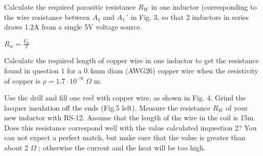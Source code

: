 \documentclass{../../myassignment}
\newcommand{\ohm}{$\Omega$ }
\begin{document}
	\begin{problem}
		Calculate the required parasitic resistance $R_W$ in one inductor (corresponding to the wire resistance between $A_1$ and $A_1\,’$ in Fig. 3, so that 2 inductors in series draws 1.2A from a single 5V voltage source.
		
	\end{problem}

	\begin{answer}
		$R_w = \frac{V_w}{I}$
	\end{answer}

	\begin{problem}
		Calculate the required length of copper wire in one inductor to get the resistance found in question 1 for a 0.4mm diam (AWG26) copper wire when the resistivity of copper is $\rho = 1.7\cdot10^{-8}$ \ohm m.
	\end{problem}

	\begin{answer}
	
	\end{answer}

	\begin{problem}
		Use the drill and fill one reel with copper wire, as shown in Fig. 4.  Grind the lacquer insulation off the ends (Fig.5 left).  Measure the resistance $R_W$ of your new inductor with RS-12.  Assume that the length of the wire in the coil is 15m.  Does this resistance correspond well with the value calculated inquestion 2?  You can not expect a perfect match, but make sure that the value is greater than about 2 \ohm; otherwise the current and the heat will be too high.
	\end{problem}

	\begin{answer}
	
	\end{answer}
\end{document}
